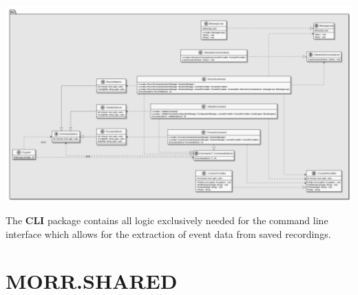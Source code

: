 \begin{center}
    \includegraphics[width=1.0\textwidth]{resources/Packages/CLI.png}
\end{center}

The \textbf{CLI} package contains all logic exclusively needed for the command line interface which allows for the extraction of event data from saved recordings.

\begin{packif}
\end{packif}

\begin{packclass}
\end{packclass}

\newpage
\section{MORR.SHARED}

